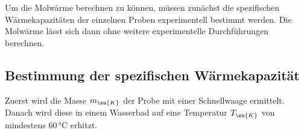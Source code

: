 Um die Molwärme berechnen zu können, müssen zunächst die spezifischen
Wärmekapazitäten der einzelnen Proben experimentell bestimmt werden.
Die Molwärme lässt sich dann ohne weitere experimentelle Durchführungen
berechnen.
\subsection{Bestimmung der spezifischen Wärmekapazität}
Zuerst wird die Masse $m_\su{K}$ der Probe mit einer Schnellwaage ermittelt.
Danach wird diese in einem Wasserbad auf eine Temperatur $T_\su{K}$ von
mindestens $60\,\si{\celsius}$ erhitzt.
